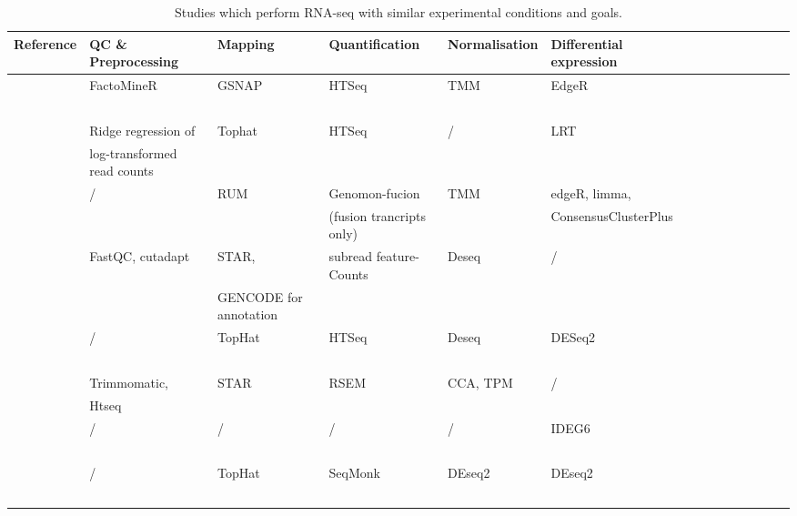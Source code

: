 \begin{landscape}
	\pagestyle{empty}
\begin{table}[h]
	\footnotesize
    \centering
    \captionsetup{font=footnotesize}
    \caption{Studies which perform RNA-seq with similar experimental conditions and goals.}
	\label{tab:rnaseq_experiments}
    \begin{tabular}{llllllllllllll}
		\toprule
		\textbf{Reference} & \textbf{QC \& Preprocessing} & \textbf{Mapping} & \textbf{Quantification} & \textbf{Normalisation} & \textbf{Differential expression}  \\ \midrule
        \cite{cardoso2019gene} & FactoMineR & GSNAP & HTSeq & TMM &  EdgeR  \\
        ~ & ~ & ~ & ~ & ~ &   \\ \hline
        \cite{mostafavi2014type} & Ridge regression of  & Tophat & HTSeq & / & LRT  \\
        ~ & log-transformed read counts & ~ & ~ & ~ &   \\ \hline
        \cite{shiozawa2017gene} & / & RUM & Genomon-fucion  & TMM & edgeR, limma,   \\
        ~ & ~ & ~ & (fusion trancripts only) & ~ & ConsensusClusterPlus  \\ \hline
        \cite{schubert2018perturbation} & FastQC, cutadapt & STAR,  & subread feature-Counts & Deseq & /  \\
        ~ & ~ & GENCODE for annotation & ~ & ~ &   \\ \hline
        \cite{schmiedel2018impact} & / & TopHat & HTSeq & Deseq & DESeq2  \\
        ~ & ~ & ~ & ~ & ~ &   \\ \hline
        \cite{lee2020lineage} &  Trimmomatic,  & STAR & RSEM  & CCA, TPM & /  \\
        ~ & Htseq & ~ & ~ & ~ &   \\ \hline
        \cite{wang2013dynamic} & / & / & / & / & IDEG6  \\
        ~ & ~ & ~ & ~ & ~ &   \\ \hline
        \cite{gatt2021tyrosol} & / & TopHat & SeqMonk & DEseq2 & DEseq2  \\ 
        ~ & ~ & ~ & ~ & ~ &   \\ \bottomrule
    \end{tabular}
\end{table}
\end{landscape}

